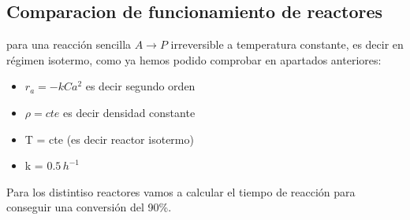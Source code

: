 \subsection{Comparacion de funcionamiento de reactores}
\noindent para una reacción sencilla $A \rightarrow P$ irreversible a temperatura constante, es decir en régimen isotermo, como ya hemos podido comprobar en apartados anteriores:

\begin{itemize}
    \item $r_a = -kCa^2$ es decir segundo orden
    \item $\rho = cte$ es decir densidad constante
    \item T = cte (es decir reactor isotermo)
    \item k = $0.5 \, h^{-1}$
\end{itemize}


\noindent Para los distintiso reactores vamos a calcular el tiempo de reacción para conseguir una conversión del 90\%.

